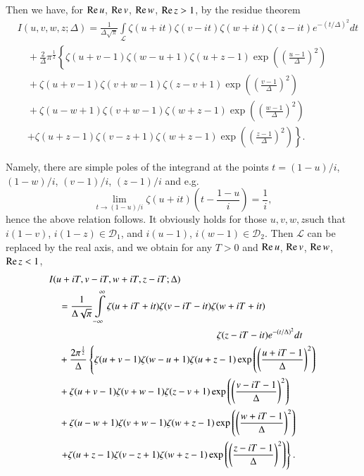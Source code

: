 Then we have, for $\operatorname{Re} u$, $\operatorname{Re} v$, $\operatorname{Re} w$, $\operatorname{Re} z >1$, by the residue theorem
\begin{align*}
& I (u,v,w,z;\Delta) = \frac{1}{\Delta \sqrt{\pi}}
  \int\limits_{\mathscr{L}} \zeta (u + it) \zeta(v - it) \zeta(w + it)
  \zeta(z - it) e^{-(t/\Delta)^2} dt \\ 
&\quad + \frac{2}{\Delta} \pi^{\frac{1}{2}} \left\{ \zeta (u+ v -1)
  \zeta(w-u+1) \zeta(u+z-1) \exp \left( \left(\frac{u-1}{\Delta}
  \right)^2\right) \right.\\ 
&\quad + \zeta(u+v-1) \zeta(v+w-1) \zeta(z-v+1) \exp
  \left(\left(\frac{v-1}{\Delta} \right)^2\right)\\ 
&\quad + \zeta(u-w+1) \zeta(v+w-1) \zeta(w+z-1) \exp
  \left(\left(\frac{w-1}{\Delta} \right)^2\right)\\ 
&\quad \left. + \zeta(u+z-1) \zeta (v-z+1) \zeta(w+z-1) \exp
  \left(\left(\frac{z-1}{\Delta} \right)^2 \right) \right\}. 
\end{align*}

Namely, there are simple poles of the integrand at the points $t =
(1-u)/i$, $(1-w)/i$, $(v-1)/i$, $(z-1)/i$ and e.g. 
$$
\lim\limits_{t \to (1-u)/i} \zeta(u+it) \left(t - \frac{1-u}{i} \right) = \frac{1}{i}, 
$$
hence the above relation follows. It obviously holds for those
$u,v,w,z$\pageoriginale such that $i(1-v)$, $i(1-z) \in
\mathscr{D}_1$, and $i(u-1)$, $i(w-1) \in \mathscr{D}_2$. Then
$\mathscr{L}$ can be replaced by the real axis, and we obtain for any
$T>0$ and $\operatorname{Re} u$, $\operatorname{Re} v$, $\operatorname{Re} w$, $\operatorname{Re} z <1$, 
\begin{align}
& I(u+ iT, v - iT, w + iT, z - i T; \Delta)\label{c5:eq5.20}\\
&\quad = \frac{1}{\Delta \sqrt{\pi}} \int\limits^\infty_{-\infty} \zeta(u+iT
+ it) \zeta(v-iT-it) \zeta (w+ iT + it)\notag\\ 
&\hspace{6cm}\zeta (z-iT - it) e^{-(t/\Delta)^2} dt\notag\\
&\quad + \frac{2\pi^{\frac{1}{2}}}{\Delta} \left\{ \zeta (u+v-1)
\zeta(w-u+1) \zeta(u+z-1) \exp \left( \left(\frac{u+iT
  -1}{\Delta}\right)^2 \right)\right.\notag\\ 
&\quad + \zeta (u+v-1) \zeta(v+w-1) \zeta(z-v+1) \exp \left(
\left(\frac{v-iT-1}{\Delta} \right)^2\right)\notag\\ 
&\quad + \zeta(u-w+1) \zeta(v+w-1) \zeta(w+z-1) \exp \left( \left(
\frac{w+iT-1}{\Delta}\right)^2\right)\notag\\ 
&\quad \left. + \zeta(u+z-1) \zeta(v-z+1) \zeta(w+z-1) \exp \left(\left(\frac{z-iT-1}{\Delta} \right)^2 \right) \right\}.\notag
\end{align}

